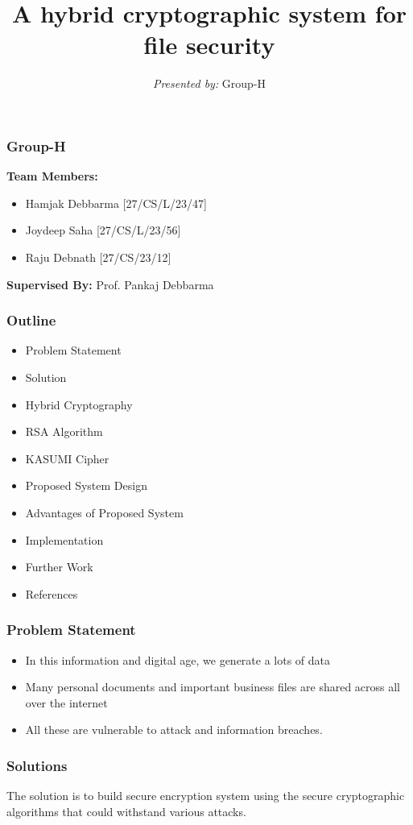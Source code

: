 \documentclass{beamer}
\title{A hybrid cryptographic system for file security}
\subtitle{}
\author{\textit{Presented by:} Group-H}
\institute[TIT]{
Dept. Of Computer Science and Engineering\\
Tripura Institute of Technology, Narsingarh\\
\medskip
}
\date{}
\begin{document}
\begin{frame}
\titlepage
\end{frame}

\begin{frame}[t]
	\frametitle{Group-H}
	\large \textbf{Team Members: }\\
	\begin{itemize}
		\item Hamjak Debbarma [27/CS/L/23/47]
		\item Joydeep Saha  [27/CS/L/23/56]
		\item Raju Debnath  [27/CS/23/12]
	\end{itemize}
\vspace{0.5in}
 \large \textbf{Supervised By: }  Prof. Pankaj Debbarma\\
\end{frame}


\begin{frame}
\frametitle{Outline}
\begin{itemize}
\item Problem Statement
\item Solution
\item Hybrid Cryptography 
\item RSA Algorithm
\item KASUMI Cipher
\item Proposed System Design 
\item Advantages of Proposed System 
\item Implementation
\item Further Work
\item References
\end{itemize}
\end{frame}

\begin{frame}
	\frametitle{Problem Statement}
	\begin{itemize}
		\item In this information and digital age, we generate a lots of data
		\item Many personal documents and important business files are shared across all over the internet
		\item All these are vulnerable to attack and information breaches.
	\end{itemize}
\end{frame}

\begin{frame}
	\frametitle{Solutions}
	The solution is to build secure encryption system using the secure cryptographic algorithms that could withstand various attacks.
\end{frame}
\end{document}
